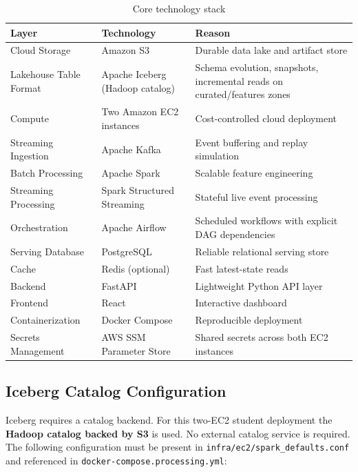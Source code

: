 \documentclass[11pt,a4paper]{article}
\begin{document}
\begin{table}[H]
\centering
\begin{tabularx}{\linewidth}{L{4cm}L{4cm}X}
\toprule
\textbf{Layer} & \textbf{Technology} & \textbf{Reason} \\
\midrule
Cloud Storage & Amazon S3 & Durable data lake and artifact store \\
Lakehouse Table Format & Apache Iceberg (Hadoop catalog) & Schema evolution, snapshots, incremental reads on curated/features zones \\
Compute & Two Amazon EC2 instances & Cost-controlled cloud deployment \\
Streaming Ingestion & Apache Kafka & Event buffering and replay simulation \\
Batch Processing & Apache Spark & Scalable feature engineering \\
Streaming Processing & Spark Structured Streaming & Stateful live event processing \\
Orchestration & Apache Airflow & Scheduled workflows with explicit DAG dependencies \\
Serving Database & PostgreSQL & Reliable relational serving store \\
Cache & Redis (optional) & Fast latest-state reads \\
Backend & FastAPI & Lightweight Python API layer \\
Frontend & React & Interactive dashboard \\
Containerization & Docker Compose & Reproducible deployment \\
Secrets Management & AWS SSM Parameter Store & Shared secrets across both EC2 instances \\
\bottomrule
\end{tabularx}
\caption{Core technology stack}
\end{table}

\subsection{Iceberg Catalog Configuration}

\begin{importantbox}
Iceberg requires a catalog backend. For this two-EC2 student deployment the \textbf{Hadoop catalog
backed by S3} is used. No external catalog service is required. The following configuration must
be present in \texttt{infra/ec2/spark\_defaults.conf} and referenced in
\texttt{docker-compose.processing.yml}:
\end{importantbox}
\end{document}
